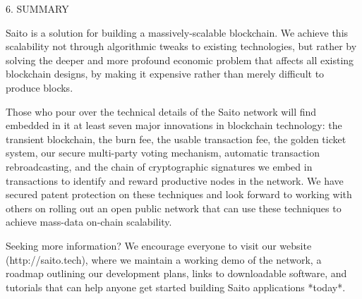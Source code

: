 \documentclass[11.5pt, oneside]{article}   	%
\begin{document}
\begin{multicols}{2}
6. SUMMARY

Saito is a solution for building a massively-scalable blockchain. We achieve this scalability not through algorithmic tweaks to existing technologies, but rather by solving the deeper and more profound economic problem that affects all existing blockchain designs, by making it expensive rather than merely difficult to produce blocks.

Those who pour over the technical details of the Saito network will find embedded in it at least seven major innovations in blockchain technology: the transient blockchain, the burn fee, the usable transaction fee, the golden ticket system, our secure multi-party voting mechanism, automatic transaction rebroadcasting, and the chain of cryptographic signatures we embed in transactions to identify and reward productive nodes in the network. We have secured patent protection on these techniques and look forward to working with others on rolling out an open public network that can use these techniques to achieve mass-data on-chain scalability.

Seeking more information? We encourage everyone to visit our website (http://saito.tech), where we maintain a working demo of the network, a roadmap outlining our development plans, links to downloadable software, and tutorials that can help anyone get started building Saito applications *today*.         

\end{multicols} 
\end{document}
